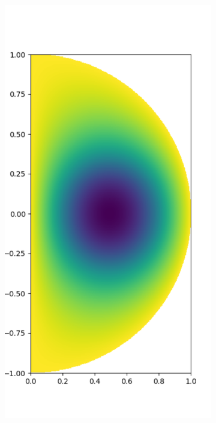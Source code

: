 \documentclass[11pt, oneside]{article}   	%
\begin{document}
\begin{figure}[t]
	\begin{subfigure}{0.3\textwidth}
	\includegraphics[scale=0.3]{solution-poisson}
	\centering
	\end{subfigure}

\end{figure}
\end{document}
